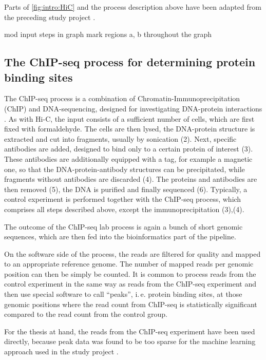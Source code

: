 Parts of \cref{fig:intro:HiC} and the process description above 
have been adapted from the preceding study project \cite{Krauth2020}.



\xxx mod input steps in graph
\xxx mark regions a, b throughout the graph

\subsection{The ChIP-seq process for determining protein binding sites} \label{sec:intro:chipseq}
The ChIP-seq process is a combination of Chromatin-Immunoprecipitation (ChIP) and DNA-sequencing, 
designed for investigating DNA-protein interactions \cite{Johnson2007,Robertson2007}.
As with Hi-C, the input consists of a sufficient number of cells, which are first fixed with formaldehyde.
The cells are then lysed, the DNA-protein structure is extracted and cut into fragments, 
usually by sonication (2).
Next, specific antibodies are added, designed to bind only to a certain protein of interest (3).
These antibodies are additionally equipped with a tag, for example a magnetic one, so that 
the DNA-protein-antibody structures can be precipitated, while fragments without antibodies are discarded (4).
The proteins and antibodies are then removed (5), 
the DNA is purified and finally sequenced (6).
Typically, a control experiment is performed together with the ChIP-seq process, 
which comprises all steps described above, except the immunoprecipitation (3),(4).

The outcome of the ChIP-seq lab process is again a bunch of short genomic sequences, 
which are then fed into the bioinformatics part of the pipeline.

On the software side of the process, the reads are filtered for quality and mapped to an appropriate reference genome.
The number of mapped reads per genomic position can then be simply be counted.
It is common to process reads from the control experiment in the same way as reads from the ChIP-seq experiment
and then use special software to call ``peaks'', i.\,e. protein binding sites,
at those genomic positions where the read count from ChIP-seq
is statistically significant compared to the read count from the control group.

For the thesis at hand, the reads from the ChIP-seq experiment have been used directly,
because peak data was found to be too sparse for the machine learning approach used 
in the study project \cite{Krauth2020}.

